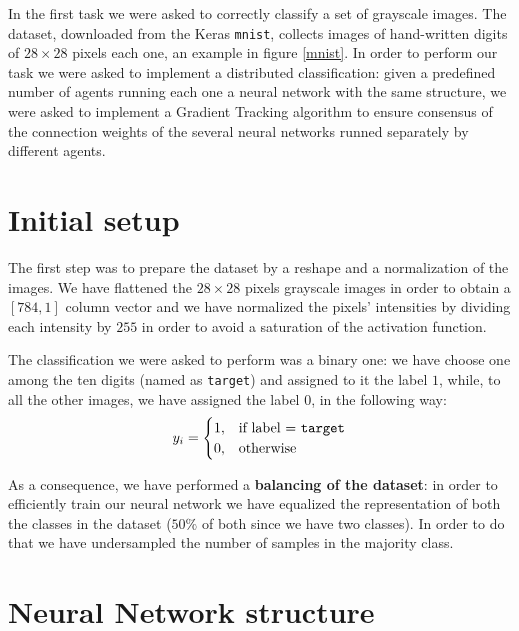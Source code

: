 \documentclass[a4paper,11pt,oneside]{book}
\begin{document}
In the first task we were asked to correctly classify a set of grayscale images. The dataset, downloaded from the Keras \texttt{mnist}, collects images of hand-written digits of $28\times28$ pixels each one, an example in figure \ref{mnist}. In order to perform our task we were asked to implement a distributed classification: given a predefined number of agents running each one a neural network with the same structure, we were asked to implement a Gradient Tracking algorithm to ensure consensus of the connection weights of the several neural networks runned separately by different agents.

\section{Initial setup}
The first step was to prepare the dataset by a reshape and a normalization of the images. We have flattened the $28\times28$ pixels grayscale images in order to obtain a $[784,1]$ column vector and we have normalized the pixels' intensities by dividing each intensity by $255$ in order to avoid a saturation of the activation function.

The classification we were asked to perform was a binary one: we have choose one among the ten digits (named as \texttt{target}) and assigned to it the label $1$, while, to all the other images, we have assigned the label $0$, in the following way:
\begin{equation}
y_i = 
\begin{cases}
1, & \text{if label = \texttt{target}} \\
0, & \text{otherwise}
\end{cases}
\end{equation}

As a consequence, we have performed a \textbf{balancing of the dataset}: in order to efficiently train our neural network we have equalized the representation of both the classes in the dataset ($50 \%$ of both since we have two classes). In order to do that we have undersampled the number of samples in the majority class. 

\section{Neural Network structure}
\end{document}
